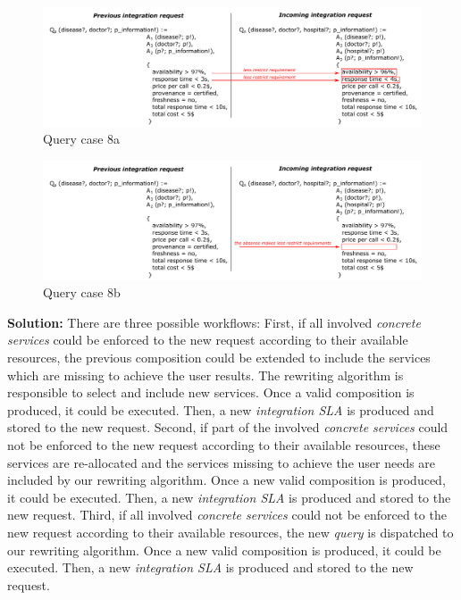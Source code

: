 \begin{figure}[h!]
\center
\includegraphics[scale=0.85]{figures/query-case-8a.pdf}\caption{Query case 8a} \label{fig:case8a}
\end{figure}

\begin{figure}[h!]
\center
\includegraphics[scale=0.85]{figures/query-case-8b.pdf}\caption{Query case 8b} \label{fig:case8b}
\end{figure}

\bigskip
\noindent \textbf{Solution:} There are three possible workflows: First, if all involved \textsl{concrete services} could be enforced to the new request according to their available resources, the previous composition could be extended to include the services which are missing to achieve the user results. The rewriting algorithm is responsible to select and include new services. Once a valid composition is produced, it could be executed. Then, a new \textsl{integration SLA} is produced and stored to the new request. Second, if part of the involved \textsl{concrete services} could not be enforced to the new request according to their available resources, these services are re-allocated and the services missing to achieve the user needs are included by our rewriting algorithm. Once a new valid composition is produced, it could be executed. Then, a new \textsl{integration SLA} is produced and stored to the new request. Third, if all involved \textsl{concrete services} could not be enforced to the new request according to their available resources, the new \textsl{query} is dispatched to our rewriting algorithm. Once a new valid composition is produced, it could be executed. Then, a new \textsl{integration SLA} is produced and stored to the new request.

